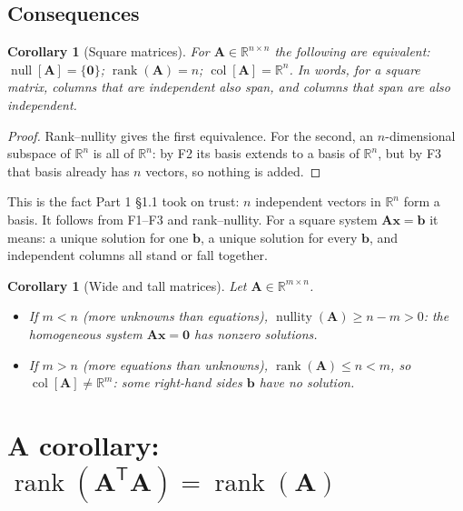 \documentclass[11pt]{article}
\theoremstyle{plain}
\newtheorem{cor}[thm]{Corollary}
\theoremstyle{definition}
\theoremstyle{remark}
\newcommand{\R}{\mathbb{R}}
\newcommand{\vc}[1]{\mathbf{#1}}
\newcommand{\mt}[1]{\mathbf{#1}}
\newcommand{\T}{^{\mathsf{T}}}
\newcommand{\colsp}[1]{\operatorname{col}[#1]}
\newcommand{\nullsp}[1]{\operatorname{null}[#1]}
\DeclareMathOperator{\rank}{rank}
\DeclareMathOperator{\nullity}{nullity}
\begin{document}
\subsection{Consequences}
\begin{cor}[Square matrices]
\label{cor:square}
For $\mt{A}\in\R^{n\times n}$ the following are equivalent: $\nullsp{\mt{A}}=\{\vc{0}\}$;
$\rank(\mt{A})=n$; $\colsp{\mt{A}}=\R^{n}$. In words, for a square matrix,
columns that are independent also span, and columns that span are also
independent.
\end{cor}

\begin{proof}
Rank--nullity gives the first equivalence. For the second, an $n$-dimensional
subspace of $\R^{n}$ is all of $\R^{n}$: by F2 its basis extends to a basis of
$\R^{n}$, but by F3 that basis already has $n$ vectors, so nothing is added.
\end{proof}

\noindent This is the fact Part 1 \S1.1 took on trust: $n$ independent vectors in
$\R^{n}$ form a basis. It follows from F1--F3 and rank--nullity. For a square
system $\mt{A}\vc{x}=\vc{b}$ it means: a unique solution for one $\vc{b}$, a
unique solution for every $\vc{b}$, and independent columns all stand or fall
together.

\begin{cor}[Wide and tall matrices]
\label{cor:widetall}
Let $\mt{A}\in\R^{m\times n}$.
\begin{itemize}[leftmargin=1.4em,itemsep=2pt]
  \item If $m<n$ (more unknowns than equations), $\nullity(\mt{A})\ge n-m>0$: the
        homogeneous system $\mt{A}\vc{x}=\vc{0}$ has nonzero solutions.
  \item If $m>n$ (more equations than unknowns), $\rank(\mt{A})\le n<m$, so
        $\colsp{\mt{A}}\neq\R^{m}$: some right-hand sides $\vc{b}$ have no
        solution.
\end{itemize}
\end{cor}

\section{A corollary: \texorpdfstring{$\rank(\mt{A}\T\mt{A})=\rank(\mt{A})$}{rank(A'A) = rank(A)}}
\end{document}
